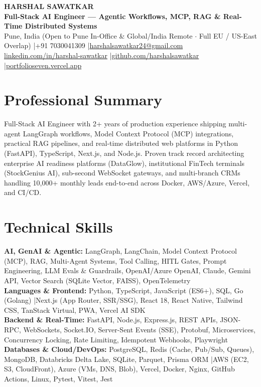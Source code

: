 \documentclass[a4paper,9pt]{article}
\begin{document}
\begin{center}
    {\Large \textbf{HARSHAL SAWATKAR}} \\[1.5pt]
    \textbf{Full-Stack AI Engineer --- Agentic Workflows, MCP, RAG \& Real-Time Distributed Systems} \\[1.5pt]
    \footnotesize Pune, India (Open to Pune In-Office \& Global/India Remote $\cdot$ Full EU / US-East Overlap) \enspace|\enspace +91 7030041309 \enspace|\enspace \href{mailto:harshalsawatkar24@gmail.com}{harshalsawatkar24@gmail.com} \\[1pt]
    \href{https://www.linkedin.com/in/harshal-sawatkar/}{linkedin.com/in/harshal-sawatkar} \enspace|\enspace \href{https://github.com/harshalsawatkar}{github.com/harshalsawatkar} \enspace|\enspace \href{https://portfolioseven.vercel.app/}{portfolioseven.vercel.app}
\end{center}

\vspace{-5pt}

\section*{Professional Summary}
Full-Stack AI Engineer with 2+ years of production experience shipping multi-agent LangGraph workflows, Model Context Protocol (MCP) integrations, practical RAG pipelines, and real-time distributed web platforms in Python (FastAPI), TypeScript, Next.js, and Node.js. Proven track record architecting enterprise AI readiness platforms (DataGlow), institutional FinTech terminals (StockGenius AI), sub-second WebSocket gateways, and multi-branch CRMs handling 10,000+ monthly leads end-to-end across Docker, AWS/Azure, Vercel, and CI/CD.

\section*{Technical Skills}
\textbf{AI, GenAI \& Agentic:} LangGraph, LangChain, Model Context Protocol (MCP), RAG, Multi-Agent Systems, Tool Calling, HITL Gates, Prompt Engineering, LLM Evals \& Guardrails, OpenAI/Azure OpenAI, Claude, Gemini API, Vector Search (SQLite Vector, FAISS), OpenTelemetry \\[1pt]
\textbf{Languages \& Frontend:} Python, TypeScript, JavaScript (ES6+), SQL, Go (Golang) \enspace|\enspace Next.js (App Router, SSR/SSG), React 18, React Native, Tailwind CSS, TanStack Virtual, PWA, Vercel AI SDK \\[1pt]
\textbf{Backend \& Real-Time:} FastAPI, Node.js, Express.js, REST APIs, JSON-RPC, WebSockets, Socket.IO, Server-Sent Events (SSE), Protobuf, Microservices, Concurrency Locking, Rate Limiting, Idempotent Webhooks, Playwright \\[1pt]
\textbf{Databases \& Cloud/DevOps:} PostgreSQL, Redis (Cache, Pub/Sub, Queues), MongoDB, Databricks Delta Lake, SQLite, Parquet, Prisma ORM \enspace|\enspace AWS (EC2, S3, CloudFront), Azure (VMs, DNS, Blob), Vercel, Docker, Nginx, GitHub Actions, Linux, Pytest, Vitest, Jest
\end{document}
